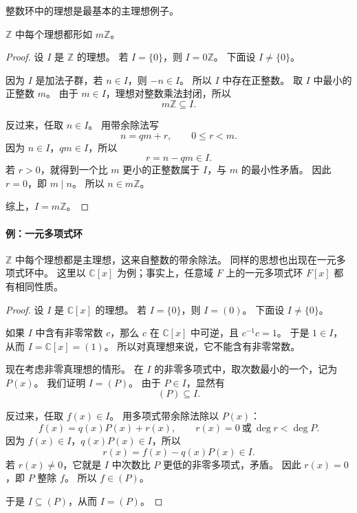 整数环中的理想是最基本的主理想例子。

\begin{theorem}\label{thm:z-ideals-principal}
$\mathbb Z$ 中每个理想都形如 $m\mathbb Z$。
\end{theorem}

\begin{proof}
设 $I$ 是 $\mathbb Z$ 的理想。
若 $I=\{0\}$，则 $I=0\mathbb Z$。
下面设 $I\neq\{0\}$。

因为 $I$ 是加法子群，若 $n\in I$，则 $-n\in I$。
所以 $I$ 中存在正整数。
取 $I$ 中最小的正整数 $m$。
由于 $m\in I$，理想对整数乘法封闭，所以
\[
m\mathbb Z\subseteq I.
\]

反过来，任取 $n\in I$。
用带余除法写
\[
n=qm+r,\qquad 0\leq r<m.
\]
因为 $n\in I$，$qm\in I$，所以
\[
r=n-qm\in I.
\]
若 $r>0$，就得到一个比 $m$ 更小的正整数属于 $I$，与 $m$ 的最小性矛盾。
因此 $r=0$，即 $m\mid n$。
所以 $n\in m\mathbb Z$。

综上，$I=m\mathbb Z$。
\end{proof}

\paragraph*{例：一元多项式环}

$\mathbb Z$ 中每个理想都是主理想，这来自整数的带余除法。
同样的思想也出现在一元多项式环中。
这里以 $\mathbb C[x]$ 为例；事实上，任意域 $F$ 上的一元多项式环 $F[x]$ 都有相同性质。


\begin{proof}
设 $I$ 是 $\mathbb C[x]$ 的理想。
若 $I=\{0\}$，则 $I=(0)$。
下面设 $I\neq\{0\}$。

如果 $I$ 中含有非零常数 $c$，那么 $c$ 在 $\mathbb C[x]$ 中可逆，且 $c^{-1}c=1$。
于是 $1\in I$，从而 $I=\mathbb C[x]=(1)$。
所以对真理想来说，它不能含有非零常数。

现在考虑非零真理想的情形。
在 $I$ 的非零多项式中，取次数最小的一个，记为 $P(x)$。
我们证明 $I=(P)$。
由于 $P\in I$，显然有
\[
(P)\subseteq I.
\]

反过来，任取 $f(x)\in I$。
用多项式带余除法除以 $P(x)$：
\[
f(x)=q(x)P(x)+r(x),\qquad r(x)=0\ \text{或}\ \deg r<\deg P.
\]
因为 $f(x)\in I$，$q(x)P(x)\in I$，所以
\[
r(x)=f(x)-q(x)P(x)\in I.
\]
若 $r(x)$，它就是 $I$ 中次数比 $P$ 更低的非零多项式，矛盾。
因此 $r(x)=0$，即 $P$ 整除 $f$。
所以 $f\in(P)$。

于是 $I\subseteq(P)$，从而 $I=(P)$。
\end{proof}

